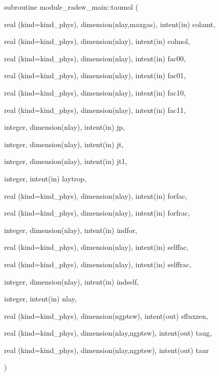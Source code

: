 {\footnotesize\ttfamily subroutine module\+\_\+radsw\+\_\+main\+::taumol (\begin{DoxyParamCaption}\item[{real (kind=kind\+\_\+phys), dimension(nlay,maxgas), intent(in)}]{colamt,  }\item[{real (kind=kind\+\_\+phys), dimension(nlay), intent(in)}]{colmol,  }\item[{real (kind=kind\+\_\+phys), dimension(nlay), intent(in)}]{fac00,  }\item[{real (kind=kind\+\_\+phys), dimension(nlay), intent(in)}]{fac01,  }\item[{real (kind=kind\+\_\+phys), dimension(nlay), intent(in)}]{fac10,  }\item[{real (kind=kind\+\_\+phys), dimension(nlay), intent(in)}]{fac11,  }\item[{integer, dimension(nlay), intent(in)}]{jp,  }\item[{integer, dimension(nlay), intent(in)}]{jt,  }\item[{integer, dimension(nlay), intent(in)}]{jt1,  }\item[{integer, intent(in)}]{laytrop,  }\item[{real (kind=kind\+\_\+phys), dimension(nlay), intent(in)}]{forfac,  }\item[{real (kind=kind\+\_\+phys), dimension(nlay), intent(in)}]{forfrac,  }\item[{integer, dimension(nlay), intent(in)}]{indfor,  }\item[{real (kind=kind\+\_\+phys), dimension(nlay), intent(in)}]{selffac,  }\item[{real (kind=kind\+\_\+phys), dimension(nlay), intent(in)}]{selffrac,  }\item[{integer, dimension(nlay), intent(in)}]{indself,  }\item[{integer, intent(in)}]{nlay,  }\item[{real (kind=kind\+\_\+phys), dimension(ngptsw), intent(out)}]{sfluxzen,  }\item[{real (kind=kind\+\_\+phys), dimension(nlay,ngptsw), intent(out)}]{taug,  }\item[{real (kind=kind\+\_\+phys), dimension(nlay,ngptsw), intent(out)}]{taur }\end{DoxyParamCaption})\hspace{0.3cm}{\ttfamily [private]}}


